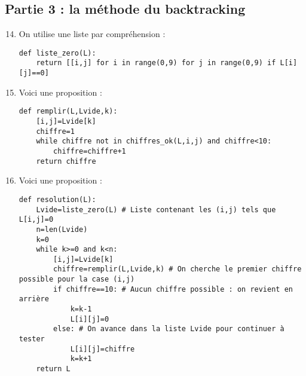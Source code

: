 \documentclass[a4paper,twoside,french,10pt]{VcCours}
\begin{document}
\bigskip

\begin{center}
 \subsection*{Partie 3 : la méthode du backtracking}
\end{center}

\medskip


\begin{enumerate}
\setcounter{enumi}{13}
\item On utilise une liste par compréhension :
\begin{center}
\begin{minipage}{0.9\textwidth}
		
\begin{lstlisting}
def liste_zero(L):
    return [[i,j] for i in range(0,9) for j in range(0,9) if L[i][j]==0]
\end{lstlisting}
\end{minipage}
\end{center}
\item Voici une proposition :
\begin{center}
\begin{minipage}{0.7\textwidth}
		
\begin{lstlisting}
def remplir(L,Lvide,k):
    [i,j]=Lvide[k]
    chiffre=1
    while chiffre not in chiffres_ok(L,i,j) and chiffre<10:
        chiffre=chiffre+1
    return chiffre 
\end{lstlisting}
\end{minipage}
\end{center}
\item Voici une proposition :

\begin{center}
\begin{minipage}{0.9\textwidth}
		
\begin{lstlisting}
def resolution(L):
    Lvide=liste_zero(L) # Liste contenant les (i,j) tels que L[i,j]=0
    n=len(Lvide)
    k=0
    while k>=0 and k<n: 
        [i,j]=Lvide[k]
        chiffre=remplir(L,Lvide,k) # On cherche le premier chiffre possible pour la case (i,j)
        if chiffre==10: # Aucun chiffre possible : on revient en arrière
            k=k-1
            L[i][j]=0
        else: # On avance dans la liste Lvide pour continuer à tester
            L[i][j]=chiffre
            k=k+1
    return L 
\end{lstlisting}
\end{minipage}
\end{center}


\end{enumerate}
\end{document}

